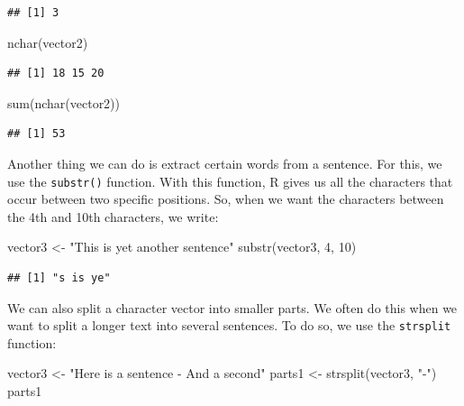 \documentclass[
]{book}
\newenvironment{Shaded}{\begin{snugshade}}{\end{snugshade}}
\newcommand{\DecValTok}[1]{\textcolor[rgb]{0.00,0.00,0.81}{#1}}
\newcommand{\FunctionTok}[1]{\textcolor[rgb]{0.00,0.00,0.00}{#1}}
\newcommand{\NormalTok}[1]{#1}
\newcommand{\OtherTok}[1]{\textcolor[rgb]{0.56,0.35,0.01}{#1}}
\newcommand{\StringTok}[1]{\textcolor[rgb]{0.31,0.60,0.02}{#1}}
\begin{document}
\begin{verbatim}
## [1] 3
\end{verbatim}

\begin{Shaded}
\begin{Highlighting}[]
\FunctionTok{nchar}\NormalTok{(vector2)}
\end{Highlighting}
\end{Shaded}

\begin{verbatim}
## [1] 18 15 20
\end{verbatim}

\begin{Shaded}
\begin{Highlighting}[]
\FunctionTok{sum}\NormalTok{(}\FunctionTok{nchar}\NormalTok{(vector2))}
\end{Highlighting}
\end{Shaded}

\begin{verbatim}
## [1] 53
\end{verbatim}

Another thing we can do is extract certain words from a sentence. For this, we use the \texttt{substr()} function. With this function, R gives us all the characters that occur between two specific positions. So, when we want the characters between the 4th and 10th characters, we write:

\begin{Shaded}
\begin{Highlighting}[]
\NormalTok{vector3 }\OtherTok{\textless{}{-}} \StringTok{"This is yet another sentence"}
\FunctionTok{substr}\NormalTok{(vector3, }\DecValTok{4}\NormalTok{, }\DecValTok{10}\NormalTok{)}
\end{Highlighting}
\end{Shaded}

\begin{verbatim}
## [1] "s is ye"
\end{verbatim}

We can also split a character vector into smaller parts. We often do this when we want to split a longer text into several sentences. To do so, we use the \texttt{strsplit} function:

\begin{Shaded}
\begin{Highlighting}[]
\NormalTok{vector3 }\OtherTok{\textless{}{-}} \StringTok{"Here is a sentence {-} And a second"}
\NormalTok{parts1 }\OtherTok{\textless{}{-}} \FunctionTok{strsplit}\NormalTok{(vector3, }\StringTok{"{-}"}\NormalTok{)}
\NormalTok{parts1}
\end{Highlighting}
\end{Shaded}
\end{document}
